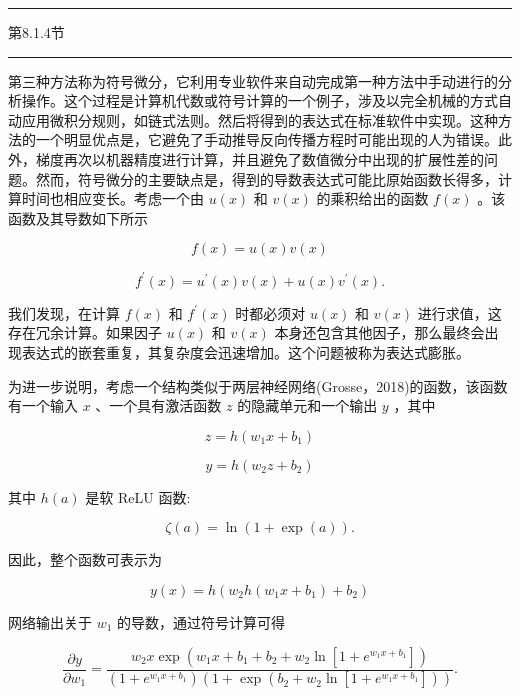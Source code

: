 \documentclass[10pt]{report}
\newcommand{\HRule}{\begin{center}\rule{0.9\linewidth}{0.2mm}\end{center}}
\begin{document}
\HRule

第8.1.4节

\HRule

第三种方法称为符号微分，它利用专业软件来自动完成第一种方法中手动进行的分析操作。这个过程是计算机代数或符号计算的一个例子，涉及以完全机械的方式自动应用微积分规则，如链式法则。然后将得到的表达式在标准软件中实现。这种方法的一个明显优点是，它避免了手动推导反向传播方程时可能出现的人为错误。此外，梯度再次以机器精度进行计算，并且避免了数值微分中出现的扩展性差的问题。然而，符号微分的主要缺点是，得到的导数表达式可能比原始函数长得多，计算时间也相应变长。考虑一个由 \(u\left( x\right)\) 和 \(v\left( x\right)\) 的乘积给出的函数 \(f\left( x\right)\) 。该函数及其导数如下所示

\[
f\left( x\right)  = u\left( x\right) v\left( x\right)  \tag{8.42}
\]

\[
{f}^{\prime }\left( x\right)  = {u}^{\prime }\left( x\right) v\left( x\right)  + u\left( x\right) {v}^{\prime }\left( x\right) . \tag{8.43}
\]

我们发现，在计算 \(f\left( x\right)\) 和 \({f}^{\prime }\left( x\right)\) 时都必须对 \(u\left( x\right)\) 和 \(v\left( x\right)\) 进行求值，这存在冗余计算。如果因子 \(u\left( x\right)\) 和 \(v\left( x\right)\) 本身还包含其他因子，那么最终会出现表达式的嵌套重复，其复杂度会迅速增加。这个问题被称为表达式膨胀。

为进一步说明，考虑一个结构类似于两层神经网络(Grosse，2018)的函数，该函数有一个输入 \(x\) 、一个具有激活函数 \(z\) 的隐藏单元和一个输出 \(y\) ，其中

\[
z = h\left( {{w}_{1}x + {b}_{1}}\right)  \tag{8.44}
\]

\[
y = h\left( {{w}_{2}z + {b}_{2}}\right)  \tag{8.45}
\]

其中 \(h\left( a\right)\) 是软 ReLU 函数:

\[
\zeta \left( a\right)  = \ln \left( {1 + \exp \left( a\right) }\right) . \tag{8.46}
\]

因此，整个函数可表示为

\[
y\left( x\right)  = h\left( {{w}_{2}h\left( {{w}_{1}x + {b}_{1}}\right)  + {b}_{2}}\right)  \tag{8.47}
\]

网络输出关于 \({w}_{1}\) 的导数，通过符号计算可得

\[
\frac{\partial y}{\partial {w}_{1}} = \frac{{w}_{2}x\exp \left( {{w}_{1}x + {b}_{1} + {b}_{2} + {w}_{2}\ln \left\lbrack  {1 + {e}^{{w}_{1}x + {b}_{1}}}\right\rbrack  }\right) }{\left( {1 + {e}^{{w}_{1}x + {b}_{1}}}\right) \left( {1 + \exp \left( {{b}_{2} + {w}_{2}\ln \left\lbrack  {1 + {e}^{{w}_{1}x + {b}_{1}}}\right\rbrack  }\right) }\right) }. \tag{8.48}
\]
\end{document}
